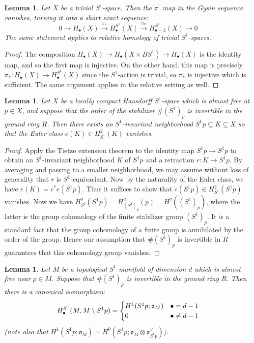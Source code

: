 \documentclass[12pt]{article}
\newtheorem{lemma}[theorem]{Lemma}
\theoremstyle{definition}
\theoremstyle{remark}
\numberwithin{equation}{subsection}
\newcommand{\oo}{\mathfrak o}
\begin{document}
\begin{lemma}\label{trivialactiongysin}
Let $X$ be a trivial $S^1$-space.  Then the $\pi^!$ map in the Gysin sequence vanishes, turning it into a short exact sequence:
\begin{equation}
0\to H_\bullet(X)\xrightarrow{\pi_\ast}H_\bullet^{S^1}(X)\xrightarrow{\cap e}H_{\bullet-2}^{S^1}(X)\to 0
\end{equation}
The same statement applies to relative homology of trivial $S^1$-spaces.
\end{lemma}

\begin{proof}
The composition $H_\bullet(X)\to H_\bullet(X\times BS^1)\to H_\bullet(X)$ is the identity map, and so the first map is injective.  On the other hand, this map is precisely $\pi_\ast:H_\bullet(X)\to H_\bullet^{S^1}(X)$ since the $S^1$-action is trivial, so $\pi_\ast$ is injective which is sufficient.  The same argument applies in the relative setting as well.
\end{proof}

\begin{lemma}\label{freeactionislocallytrivial}
Let $X$ be a locally compact Hausdorff $S^1$-space which is almost free at $p\in X$, and suppose that the order of the stabilizer $\#(S^1)_p$ is invertible in the ground ring $R$.  Then there exists an $S^1$-invariant neighborhood $S^1p\subseteq K\subseteq X$ so that the Euler class $e(K)\in H^2_{S^1}(K)$ vanishes.
\end{lemma}

\begin{proof}
Apply the Tietze extension theorem to the identity map $S^1p\to S^1p$ to obtain an $S^1$-invariant neighborhood $K$ of $S^1p$ and a retraction $r:K\to S^1p$.  By averaging and passing to a smaller neighborhood, we may assume without loss of generality that $r$ is $S^1$-equivariant.  Now by the naturality of the Euler class, we have $e(K)=r^\ast e(S^1p)$.  Thus it suffices to show that $e(S^1p)\in H^2_{S^1}(S^1p)$ vanishes.  Now we have $H^2_{S^1}(S^1p)=H^2_{(S^1)_p}(p)=H^2((S^1)_p)$, where the latter is the group cohomology of the finite stabilizer group $(S^1)_p$.  It is a standard fact that the group cohomology of a finite group is annihilated by the order of the group.  Hence our assumption that $\#(S^1)_p$ is invertible in $R$ guarantees that this cohomology group vanishes.
\end{proof}

\begin{lemma}\label{SSmanifoldPDbase}
Let $M$ be a topological $S^1$-manifold of dimension $d$ which is almost free near $p\in M$.  Suppose that $\#(S^1)_p$ is invertible in the ground ring $R$.  Then there is a canonical isomorphism:
\begin{equation}
H_\bullet^{S^1}(M,M\setminus S^1p)=\begin{cases}H^1(S^1p;\oo_M)&\bullet=d-1\cr 0&\bullet\ne d-1\end{cases}
\end{equation}
(note also that $H^1(S^1p;\oo_M)=H^0(S^1p;\oo_M\otimes\oo_{S^1p}^\vee)$).
\end{lemma}
\end{document}
